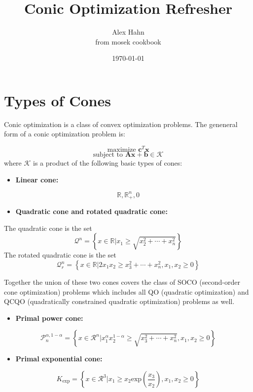 \documentclass{article}
\title{Conic Optimization Refresher}
\author{Alex Hahn \\ from mosek cookbook}
\date{\today}
\begin{document}
\maketitle

\section{Types of Cones}
Conic optimization is a class of convex optimization problems. The geneneral form of a conic optimization problem is:

$$\text{maximize } \mathbf{c}^T\mathbf{x}$$
$$\text{subject to } \mathbf{Ax} + \mathbf{b} \in \mathcal{K} $$
where $\mathcal{K}$ is a product of the following basic types of cones:

\begin{itemize}
\item{\textbf{Linear cone:}}
\end{itemize}
$$\mathbb{R}, \mathbb{R}^n_+, {0}$$

\begin{itemize}
\item{\textbf{Quadratic cone and rotated quadratic cone:}}
\end{itemize}
The quadratic cone is the set
$$\mathcal{Q}^n = \left\{ x \in \mathbb{R} \bigg| x_1 \geq \sqrt{x_2^2 +\cdots+ x_n^2}\right\}$$
The rotated quadratic cone is the set
$$\mathcal{Q}_r^n = \left\{ x \in \mathbb{R} \bigg|2x_1x_2\geq x_3^2+\cdots + x_n^2, x_1, x_2\geq 0\right\}$$

Together the union of these two cones covers the class of SOCO (second-order cone optimization)
problems which includes all QO (quadratic optimization) and QCQO (quadratically constrained
quadratic optimization) problems as well.

\begin{itemize}
\item{\textbf{Primal power cone:}}
\end{itemize}

$$\mathcal{P}^{\alpha, 1-\alpha}_n = \left\{ x \in \mathcal{R}^n\bigg|x_1^\alpha x_2^{1-\alpha}\geq\sqrt{x_3^2+\cdots+x_n^2},x_1,x_2 \geq 0\right\}$$

\begin{itemize}
\item{\textbf{Primal exponential cone:}}
\end{itemize}

$$K_{\text{exp}} = \left\{ x \in \mathcal{R}^3\bigg|x_1\geq x_2\text{exp}\left(\frac{x_3}{x_2}\right),x_1,x_2 \geq 0\right\}$$
\end{document}
